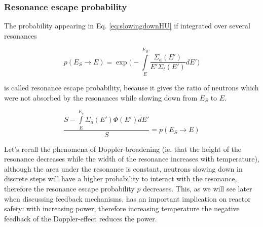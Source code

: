 \subsubsection{Resonance escape probability}

The probability appearing in Eq. \eqref{eq:slowingdownHU} if integrated over several resonances 

$$p(E_S\rightarrow E)=\exp\Bigg(-\int\limits_E^{E_S}\frac{\Sigma_a(E')}{E'\Sigma_t(E')}dE'\Bigg)$$

is called resonance escape probability, because it gives the ratio of neutrons which were not absorbed by the resonances while slowing down from $E_S$ to $E$.

$$\frac{S-\int\limits_E^{E_s}\Sigma_a(E')\Phi(E')dE'}{S}=p(E_S\rightarrow E)$$

Let's recall the phenomena of Doppler-broadening (ie. that the height of the resonance decreases while the width of the resonance increases with temperature), although the area under the resonance is constant, neutrons slowing down in discrete steps will have a higher probability to interact with the resonance, therefore the resonance escape probability $p$ decreases. This, as we will see later when discussing feedback mechanisms, has an important implication on reactor safety: with increasing power, therefore increasing temperature the negative feedback of the Doppler-effect reduces the power.

%
%
%
%
%
%
%
%
%
%

